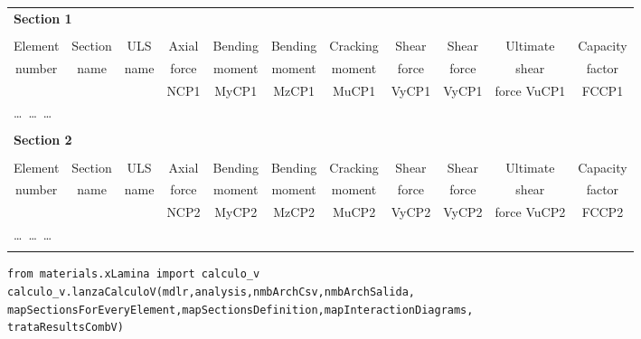 \begin{footnotesize}
\begin{center}
\begin{tabular}{ccccccccccc}
\multicolumn{7}{l}{\textbf{Section 1}} \\
\\
Element & Section & ULS  & Axial      & Bending      & Bending      & Cracking       & Shear       & Shear       & Ultimate & Capacity \\
number  & name    & name & force      & moment       & moment       & moment & force       & force       & shear    & factor       \\
        &         &      &       NCP1 &        MyCP1 &        MzCP1 & MuCP1          &       VyCP1 &       VyCP1 & force VuCP1 & FCCP1 \\
\hline
\multicolumn{7}{l}{\ldots\ \ldots\ \ldots} \\
\\
\multicolumn{7}{l}{\textbf{Section 2}} \\
\\
Element & Section & ULS  & Axial      & Bending      & Bending      & Cracking       & Shear       & Shear       & Ultimate & Capacity \\
number  & name    & name & force      & moment       & moment       & moment & force       & force       & shear    & factor       \\
        &         &      &       NCP2 &        MyCP2 &        MzCP2 & MuCP2          &       VyCP2 &       VyCP2 & force VuCP2 &       FCCP2 \\


\hline
\multicolumn{7}{l}{\ldots\ \ldots\ \ldots} \\
\\

\end{tabular}
\end{center}
\end{footnotesize}


\begin{verbatim}
from materials.xLamina import calculo_v
calculo_v.lanzaCalculoV(mdlr,analysis,nmbArchCsv,nmbArchSalida, 
mapSectionsForEveryElement,mapSectionsDefinition,mapInteractionDiagrams,
trataResultsCombV)
\end{verbatim}

\begin{paramFuncTable}
\mdlr{} \\
\analysis{} \\
\\
\nmbArchSalida{}\\
\mapSectionsForEveryElement{} \\
\mapSectionsDefinition{} \\
\mapInteractionDiagrams{} \\
\trataResultsCombV{} \\
\end{paramFuncTable}



